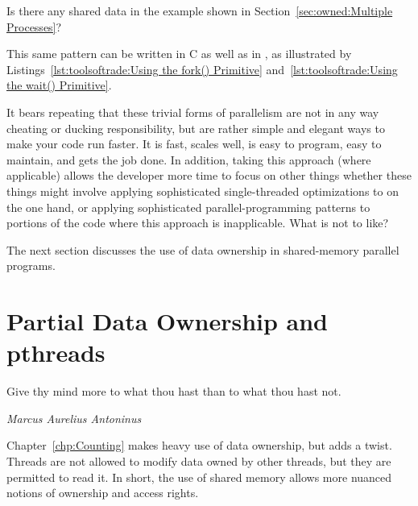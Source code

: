 \QuickQuiz{}
	Is there any shared data in the example shown in
	Section~\ref{sec:owned:Multiple Processes}?
 \QuickQuizEnd

This same pattern can be written in C as well as in , as illustrated by
Listings~\ref{lst:toolsoftrade:Using the fork() Primitive}
and~\ref{lst:toolsoftrade:Using the wait() Primitive}.

It bears repeating that these trivial forms of parallelism are not in
any way cheating or ducking responsibility, but are rather simple and
elegant ways to make your code run faster.
It is fast, scales well, is easy to program, easy to maintain, and
gets the job done.
In addition, taking this approach (where applicable) allows the developer
more time to focus on other things whether these things might involve
applying sophisticated single-threaded optimizations to 
on the one hand, or applying sophisticated parallel-programming patterns
to portions of the code where this approach is inapplicable.
What is not to like?

The next section discusses the use of data ownership in shared-memory
parallel programs.

\section{Partial Data Ownership and pthreads}
\label{sec:owned:Partial Data Ownership and pthreads}
%
\epigraph{Give thy mind more to what thou hast than to what thou hast not.}
	 {\emph{Marcus Aurelius Antoninus}}

Chapter~\ref{chp:Counting} makes heavy use of data ownership,
but adds a twist.
Threads are not allowed to modify data owned by other threads,
but they are permitted to read it.
In short, the use of shared memory allows more nuanced notions
of ownership and access rights.

